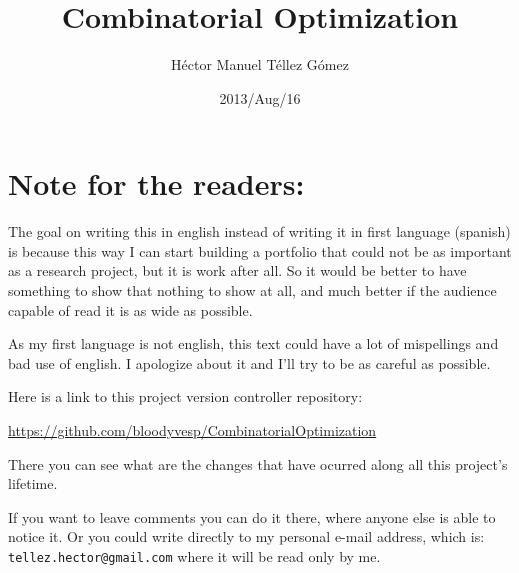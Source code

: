 ﻿\documentclass[oneside]{book}
\numberwithin{chapter}{part}
\numberwithin{section}{chapter}
\numberwithin{subsection}{section}
\numberwithin{subsubsection}{subsection}
\numberwithin{paragraph}{subsubsection}
\numberwithin{subparagraph}{paragraph}
\numberwithin{equation}{subparagraph}
\numberwithin{equation}{paragraph}
\numberwithin{equation}{subsubsection}
\numberwithin{equation}{subsection}
\numberwithin{equation}{section}
\numberwithin{equation}{chapter}
\numberwithin{equation}{part}
\begin{document}
		\frontmatter
		\title{Combinatorial Optimization}
		\author{Héctor Manuel Téllez Gómez}
		\date{2013/Aug/16}
		\maketitle

		\tableofcontents

		\mainmatter
		\chapter*{Note for the readers:}
			The goal on writing this in english instead of writing it in first language  (spanish) is because 
			this way I can start building a portfolio that could not be as important as a research project, but
			it is work after all. So it would be better to have something to show that nothing to show at all, 
			and much better if the audience capable of read it is as wide as possible.\pn
			
			As my first language is not english, this text could have a lot of mispellings and
			bad use of english. I apologize about it and I'll try to be as careful as possible.\pn
			
			Here is a link to this project version controller repository:\par
			\href{https://github.com/bloodyvesp/CombinatorialOptimization}{https://github.com/bloodyvesp/CombinatorialOptimization}\par
			There you can see what are the changes that have ocurred along all this project's lifetime.\pn
			
			If you want to leave comments you can do it there, where anyone else is able to notice it. Or you could 
			write directly to my personal e-mail address, which is: \texttt{tellez.hector@gmail.com} where it will be read only
			by me.
    
\end{document}
